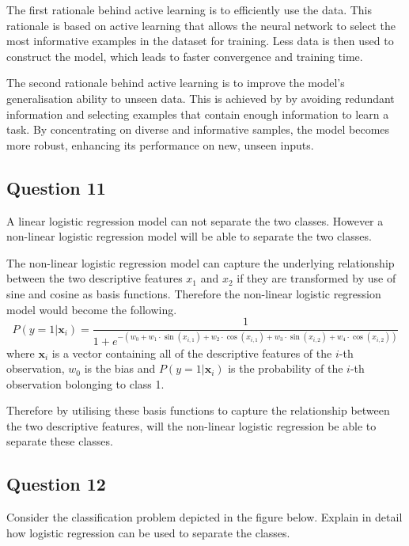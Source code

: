 \documentclass[10pt]{article}
\begin{document}
The first rationale behind active learning is to efficiently use the data. This rationale
is based on active learning that allows the neural network to select the most informative examples in the
dataset for training. Less data is then used to construct the model, which leads to faster convergence and
training time.

The second rationale behind active learning is to improve the model's generalisation ability to unseen data.
This is achieved by by avoiding redundant information and selecting examples that contain enough information
to learn a task. By concentrating on diverse and informative samples, the model becomes more robust, enhancing
its performance on new, unseen inputs.

\subsection*{Question 11}

A linear logistic regression model can not separate the two classes. However a non-linear logistic regression
model will be able to separate the two classes.

The non-linear logistic regression model can capture the underlying relationship between the two
descriptive features $x_1$ and $x_2$ if they are transformed by use of sine and cosine as basis functions. Therefore
the non-linear logistic regression model would become the following.
\begin{equation}
    P(y=1|\boldsymbol{x}_i) = \frac{1}{1 + e^{-(w_0 + w_1 \cdot \sin(x_{i,1}) + w_2 \cdot \cos(x_{i,1}) + w_3 \cdot \sin(x_{i,2}) + w_4 \cdot \cos(x_{i,2}))}}
\end{equation}
where $\boldsymbol{x}_i$ is a vector containing all of the descriptive features of the $i$-th observation, $w_0$ is
the bias and $P(y=1|\boldsymbol{x}_i)$ is the probability of the $i$-th observation bolonging to class 1.

Therefore by utilising these basis functions to capture the relationship between the two descriptive features,
will the non-linear logistic regression be able to separate these classes.

\subsection*{Question 12}

Consider the classification problem depicted in the figure below. Explain in detail how logistic regression
can be used to separate the classes.
\end{document}
